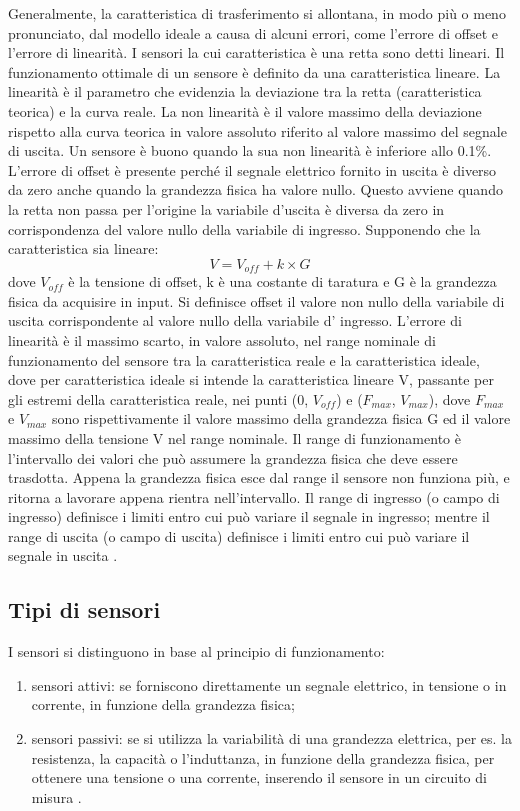 \documentclass[a4paper]{report} %
\begin{document}
Generalmente, la caratteristica di trasferimento si allontana, in modo più o meno pronunciato, dal modello ideale a causa di alcuni errori, come l'errore di offset e l'errore di linearità. 
I sensori la cui caratteristica è una retta sono detti lineari. Il funzionamento ottimale di un sensore è definito da una caratteristica lineare. La linearità è il parametro che evidenzia la deviazione tra la retta (caratteristica teorica) e la curva reale. 
La non linearità è il valore massimo della deviazione rispetto alla curva teorica in valore assoluto riferito al valore massimo del segnale di uscita. Un sensore è buono quando la sua non linearità è inferiore allo 0.1\%.
L'errore di offset è presente perché il segnale elettrico fornito in uscita è diverso da zero anche quando la grandezza fisica ha valore nullo. Questo avviene quando la retta non passa per l'origine la variabile d'uscita è diversa da zero in corrispondenza del valore nullo della variabile di ingresso. Supponendo che la caratteristica sia lineare:
\begin{equation}
V = V_{off} + k \times G
\end{equation}
dove $V_{off}$ è la tensione di offset, k è una costante di taratura e G è la grandezza fisica da acquisire in input. Si definisce offset il valore non nullo della variabile di uscita corrispondente al valore nullo della variabile d' ingresso.
L'errore di linearità è il massimo scarto, in valore assoluto, nel range nominale di funzionamento del sensore tra la caratteristica reale e la caratteristica ideale, dove per caratteristica ideale si intende la caratteristica lineare V, passante per gli estremi della caratteristica reale, nei punti (0, $V_{off}$) e ($F_{max}$, $V_{max}$), dove $F_{max}$ e $V_{max}$ sono rispettivamente il valore massimo della grandezza fisica G ed il valore massimo della tensione V nel range nominale. 
Il range di funzionamento è l'intervallo dei valori che può assumere la grandezza fisica che deve essere trasdotta. Appena la grandezza fisica esce dal range il sensore non funziona più, e ritorna a lavorare appena rientra nell'intervallo. Il range di ingresso (o campo di ingresso) definisce i limiti entro cui può variare il segnale in ingresso; mentre il range di uscita (o campo di uscita) definisce i limiti entro cui può variare il segnale in uscita \cite{art:rif.1, art:rif.12}.   

\subsection{Tipi di sensori}
I sensori si distinguono in base al principio di funzionamento:
\begin{enumerate}
\item sensori attivi: se forniscono direttamente un segnale elettrico, in tensione o in corrente, in funzione della grandezza fisica;
\item sensori passivi: se si utilizza la variabilità di una grandezza elettrica, per es. la resistenza, la capacità o l'induttanza, in funzione della grandezza fisica, per ottenere una tensione o una corrente, inserendo il sensore in un circuito di misura \cite{art:rif.1}.   
\end{enumerate}
\end{document}
